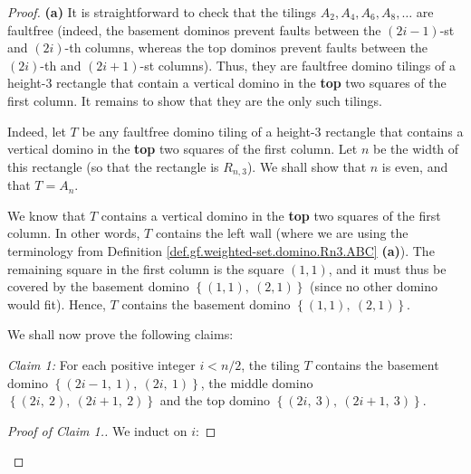 \begin{fineprint}
\begin{proof}
\textbf{(a)} It is straightforward to check that the tilings $A_{2}%
,A_{4},A_{6},A_{8},\ldots$ are faultfree (indeed, the basement dominos prevent
faults between the $\left(  2i-1\right)  $-st and $\left(  2i\right)  $-th
columns, whereas the top dominos prevent faults between the $\left(
2i\right)  $-th and $\left(  2i+1\right)  $-st columns). Thus, they are
faultfree domino tilings of a height-$3$ rectangle that contain a vertical
domino in the \textbf{top} two squares of the first column. It remains to show
that they are the only such tilings.

Indeed, let $T$ be any faultfree domino tiling of a height-$3$ rectangle that
contains a vertical domino in the \textbf{top} two squares of the first
column. Let $n$ be the width of this rectangle (so that the rectangle is
$R_{n,3}$). We shall show that $n$ is even, and that $T=A_{n}$.

We know that $T$ contains a vertical domino in the \textbf{top} two squares of
the first column. In other words, $T$ contains the left wall (where we are
using the terminology from Definition \ref{def.gf.weighted-set.domino.Rn3.ABC}
\textbf{(a)}). The remaining square in the first column is the square $\left(
1,1\right)  $, and it must thus be covered by the basement domino $\left\{
\left(  1,1\right)  ,\ \left(  2,1\right)  \right\}  $ (since no other domino
would fit). Hence, $T$ contains the basement domino $\left\{  \left(
1,1\right)  ,\ \left(  2,1\right)  \right\}  $.

We shall now prove the following claims:

\begin{statement}
\textit{Claim 1:} For each positive integer $i<n/2$, the tiling $T$ contains
the basement domino $\left\{  \left(  2i-1,\ 1\right)  ,\ \left(
2i,\ 1\right)  \right\}  $, the middle domino $\left\{  \left(  2i,\ 2\right)
,\ \left(  2i+1,\ 2\right)  \right\}  $ and the top domino $\left\{  \left(
2i,\ 3\right)  ,\ \left(  2i+1,\ 3\right)  \right\}  $.
\end{statement}

\begin{proof}
[Proof of Claim 1.]We induct on $i$:


\end{proof}
\end{proof}
\end{fineprint}
